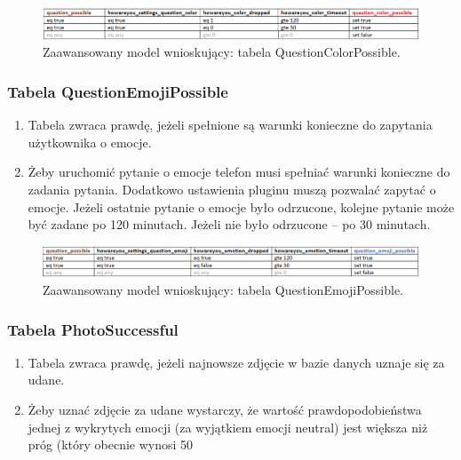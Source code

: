 \begin{figure}[H]
\centering
\includegraphics[scale=0.8]{rozdzial4/HMR_QuestionColorPossible.png}
\caption{Zaawansowany model wnioskujący: tabela QuestionColorPossible.}
\end{figure}


\subsubsection{Tabela QuestionEmojiPossible}

\begin{enumerate}
\item Tabela zwraca prawdę, jeżeli spełnione są warunki konieczne do zapytania użytkownika o emocje.
\item Żeby uruchomić pytanie o emocje telefon musi spełniać warunki konieczne do zadania pytania. Dodatkowo ustawienia pluginu muszą pozwalać zapytać o emocje. Jeżeli ostatnie pytanie o emocje było odrzucone, kolejne pytanie może być zadane po 120 minutach. Jeżeli nie było odrzucone – po 30 minutach.


\end{enumerate}

\begin{figure}[H]
\centering
\includegraphics[scale=0.8]{rozdzial4/HMR_QuestionEmojiPossible.png}
\caption{Zaawansowany model wnioskujący: tabela QuestionEmojiPossible.}
\end{figure}


\subsubsection{Tabela PhotoSuccessful}

\begin{enumerate}
\item Tabela zwraca prawdę, jeżeli najnowsze zdjęcie w bazie danych uznaje się za udane.
\item Żeby uznać zdjęcie za udane wystarczy, że wartość prawdopodobieństwa jednej z wykrytych emocji (za wyjątkiem emocji neutral) jest większa niż próg (który obecnie wynosi 50%
\end{enumerate}

